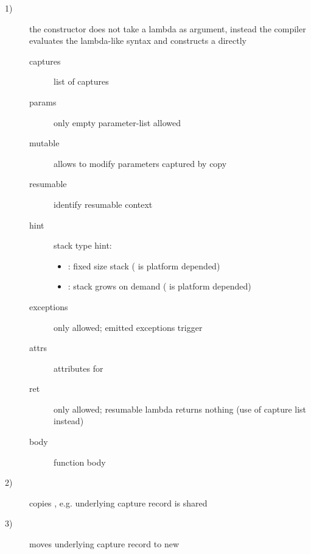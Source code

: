 \begin{description}
    \item[1)] the constructor does not take a lambda as argument, instead the
              compiler evaluates the lambda-like syntax and constructs a \ectx
              directly
              \begin{description}
                  \item[captures]     list of captures
                  \item[params]       only empty parameter-list allowed
                  \item[mutable]      allows to modify parameters captured by copy
                  \item[resumable]    identify resumable context
                  \item[hint]         stack type hint:
                                      \begin{itemize}
                                          \item {}:
                                              fixed size stack ( is
                                              platform depended)
                                          \item {}:
                                              stack grows on demand (
                                              is platform depended)
                                      \end{itemize}
                  \item[exceptions]   only  allowed; emitted exceptions
                                      trigger 
                  \item[attrs]        attributes for 
                  \item[ret]          only  allowed; resumable lambda returns nothing
                                      (use of capture list instead)
                  \item[body]         function body\\
              \end{description}
    \item[2)] copies \ectx, e.g. underlying capture record is shared
    \item[3)] moves underlying capture record to new \ectx
\end{description}

